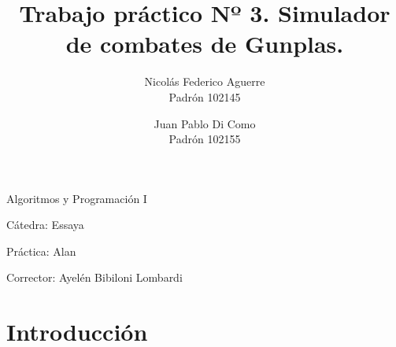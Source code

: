 \documentclass[12pt]{article}
\title{Trabajo pr\'actico Nº 3. Simulador de combates de Gunplas.}
\author{Nicol\'as Federico Aguerre\\Padr\'on 102145
		\and
		Juan Pablo Di Como\\Padr\'on 102155}
\begin{document}

	\maketitle

	Algoritmos y Programaci\'on I

	C\'atedra: Essaya 


	Pr\'actica: Alan

	Corrector: Ayel\'en Bibiloni Lombardi

	\section{Introducci\'on}
		
\end{document}
